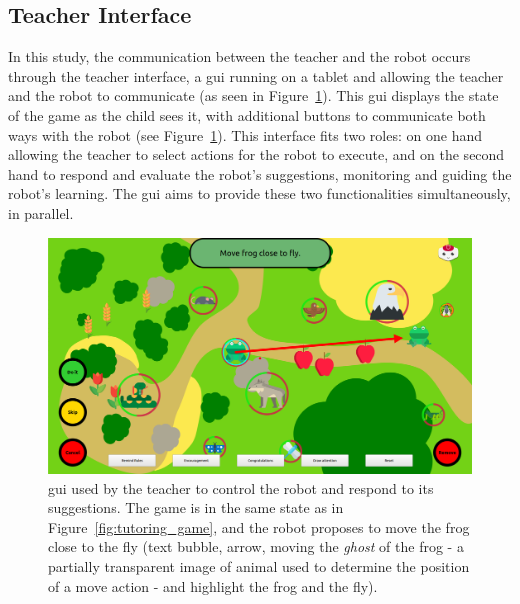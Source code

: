 \subsection{Teacher Interface} \label{sec:tuto_woz}

In this study, the communication between the teacher and the robot occurs through the teacher interface, a \gls{gui} running on a tablet and allowing the teacher and the robot to communicate (as seen in Figure~\ref{fig:tutoring_gui}). This \gls{gui} displays the state of the game as the child sees it, with additional buttons to communicate both ways with the robot (see Figure~\ref{fig:tutoring_gui}). This interface fits two roles: on one hand allowing the teacher to select actions for the robot to execute, and on the second hand to respond and evaluate the robot's suggestions, monitoring and guiding the robot's learning. The \gls{gui} aims to provide these two functionalities simultaneously, in parallel.

\begin{figure}[ht]
	\centering
	\includegraphics[width=1\textwidth]{gui.png}
	\caption{\gls{gui} used by the teacher to control the robot and respond to its suggestions. The game is in the same state as in Figure~\ref{fig:tutoring_game}, and the robot proposes to move the frog close to the fly (text bubble, arrow, moving the \textit{ghost} of the frog - a partially transparent image of animal used to determine the position of a move action - and highlight the frog and the fly).}
	\label{fig:tutoring_gui}
\end{figure}


